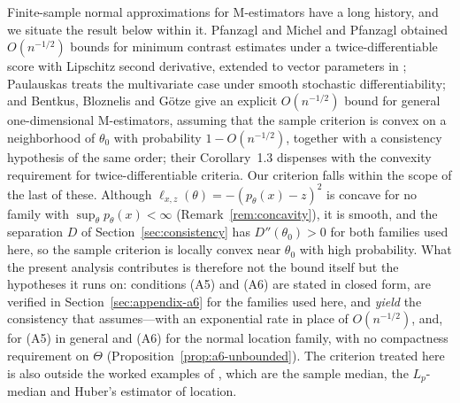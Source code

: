 Finite-sample normal approximations for M-estimators have a long history, and we situate the result below within it. Pfanzagl \cite{Pfanzagl1971,Pfanzagl1972} and Michel and Pfanzagl \cite{michel1971accuracy} obtained $O(n^{-1/2})$ bounds for minimum contrast estimates under a twice-differentiable score with Lipschitz second derivative, extended to vector parameters in \cite{Pfanzagl1973}; Paulauskas \cite{Paulauskas1996} treats the multivariate case under smooth stochastic differentiability; and Bentkus, Bloznelis and G\"otze \cite{BentkusBloznelisGotze1997} give an explicit $O(n^{-1/2})$ bound for general one-dimensional M-estimators, assuming that the sample criterion is convex on a neighborhood of $\theta_{0}$ with probability $1-O(n^{-1/2})$, together with a consistency hypothesis of the same order; their Corollary~1.3 dispenses with the convexity requirement for twice-differentiable criteria. Our criterion falls within the scope of the last of these. Although $\ell_{x,z}(\theta)=-(p_{\theta}(x)-z)^{2}$ is concave for no family with $\sup_{\theta}p_{\theta}(x)<\infty$ (Remark~\ref{rem:concavity}), it is smooth, and the separation $D$ of Section~\ref{sec:consistency} has $D''(\theta_{0})>0$ for both families used here, so the sample criterion is locally convex near $\theta_{0}$ with high probability. What the present analysis contributes is therefore not the bound itself but the hypotheses it runs on: conditions (A5) and (A6) are stated in closed form, are verified in Section~\ref{sec:appendix-a6} for the families used here, and \emph{yield} the consistency that \cite{BentkusBloznelisGotze1997} assumes---with an exponential rate in place of $O(n^{-1/2})$, and, for (A5) in general and (A6) for the normal location family, with no compactness requirement on $\Theta$ (Proposition~\ref{prop:a6-unbounded}). The criterion treated here is also outside the worked examples of \cite{BentkusBloznelisGotze1997}, which are the sample median, the $L_{p}$-median and Huber's estimator of location.

